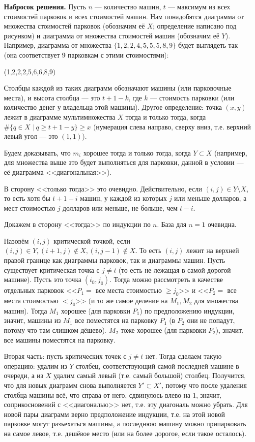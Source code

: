 \documentclass[12pt,a4paper]{article}
\begin{document}

\textbf{Набросок решения.} Пусть $n$ --- количество машин, $t$ --- максимум из всех стоимостей парковок и всех стоимостей машин. Нам понадобятся диаграмма от множества стоимостей парковок (обозначим её $X$; определение написано под рисунком) и диаграмма от множества стоимостей машин (обозначим её $Y$). Например, диаграмма от множества $\{1,2,2,4,5,5,5,8,9\}$ будет выглядеть так (она соответствует 9 парковкам с этими стоимостями):

\yng(1,2,2,2,5,6,6,8,9)

Столбцы каждой из таких диаграмм обозначают машины (или парковочные места), и высота столбца --- это $t+1-k$, где $k$ --- стоимость парковки (или количество денег у владельца этой машины). Другое определение: точка $(x,y)$ лежит в диаграмме мультимножества $X$ тогда и только тогда, когда $\#\{q\in X\mid q\geq t+1-y\}\geq x$ (нумерация слева направо, сверху вниз, т.е. верхний левый угол --- это $(1,1)$).

Будем доказывать, что $m_i$ хорошее тогда и только тогда, когда $Y\subset X$ (например, для множества выше это будет выполняться для парковки, данной в условии --- её диаграмма <<диагональная>>).

В сторону <<только тогда>> это очевидно. Действительно, если $(i,j)\in Y\setminus X$, то есть хотя бы $t+1-i$ машин, у каждой из которых $j$ или меньше долларов, а мест стоимостью $j$ долларов или меньше, не больше, чем $t-i$.

Докажем в сторону <<тогда>> по индукции по $n$. База для $n=1$ очевидна.

Назовём $(i,j)$ критической точкой, если $(i,j)\in Y,(i+1,j)\not\in X,(i,j-1)\not\in X$. То есть $(i,j)$ лежит на верхней правой границе как диаграммы парковок, так и диаграммы машин. Пусть существует критическая точка с $j\neq t$ (то есть не лежащая в самой дорогой машине). Пусть это точка $(i_0,j_0)$. Тогда можно рассмотреть в качестве отдельных парковок <<$P_1=$ все места стоимостью $\geq j_0$>> и <<$P_2=$ все места стоимостью $<j_0$>> (и то же самое деление на $M_1,M_2$ для множества машин). Тогда $M_1$ хорошее (для парковки $P_1$) по предположению индукции, значит, машины из $M_1$ все поместятся на парковку $P_1$ (в $P_2$ они не попадут, потому что там слишком дёшево). $M_2$ тоже хорошее (для парковки $P_2$), значит, все машины поместятся на парковку.

Вторая часть: пусть критических точек с $j\neq t$ нет. Тогда сделаем такую операцию: удалим из $Y$ столбец, соответствующий самой последней машине в очереди, а из $X$ удалим самый левый (т.е. самый большой) столбец. Получится, что для новых диаграмм снова выполняется $Y'\subset X'$, потому что после удаления столбца машины всё, что справа от него, сдвинулось влево на 1, значит, соприкосновений с <<диагональю>> нет, т.е. эту диагональ можно убрать. Для новой пары диаграмм верно предположение индукции, т.е. на этой новой парковке могут разъехаться машины, а последнюю машину можно припарковать на самое левое, т.е. дешёвое место (или на более дорогое, если такое осталось).\QEDA\\
\end{document}
